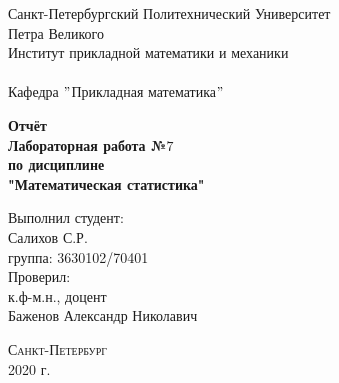 \documentclass[a4]{article}
\begin{document}
	\def\contentsname{\LARGE{Содержание}}
	\thispagestyle{empty}
	\begin{center} 
		\vspace{2cm} 
		{\Large \sc Санкт-Петербургский Политехнический Университет}\\
		\vspace{2mm}
		{\Large\sc Петра Великого}\\
		\vspace{1cm}
		{\large \sc Институт прикладной математики и механики\\ 
			\vspace{0.5mm}
			\textsc{}}\\ 
		\vspace{0.5mm}
		{\large\sc Кафедра $"$Прикладная математика$"$}\\
		\vspace{15mm}
		
		
		{\sc \textbf{Отчёт\\
			Лабораторная работа №$7$\\
			по дисциплине\\
			"Математическая статистика"}
			\vspace{6mm}
			
		}
		\vspace*{2mm}
		
		
		\begin{flushleft}
			\vspace{4cm}
			\sc Выполнил студент:\\
			\sc Салихов С.Р.\\
			\sc группа: 3630102/70401\\
			\vspace{1cm}
			\sc Проверил:\\
			\sc к.ф-м.н., доцент\\
			\sc Баженов Александр Николавич
			\vspace{20mm}
		\end{flushleft}
	\end{center} 
	\begin{center}
		\vfill {\large\textsc{Санкт-Петербург}}\\ 
		2020 г.
	\end{center}
	
	\newpage
	\pagestyle{plain}
	
	
	
\end{document}
